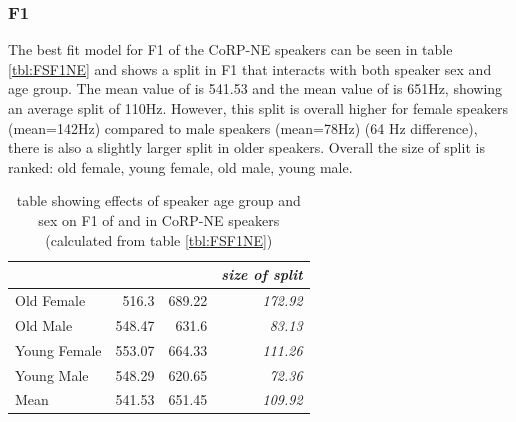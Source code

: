 \documentclass[../../../00.FullDoc/tex/ThesisSkeleton-draft2]{subfiles}
\begin{document}
\subsubsection{F1} \label{subsubsec:NEF1}

The best fit model for F1 of the CoRP-NE speakers can be seen in table \ref{tbl:FSF1NE} and shows a \FS{} split in F1 that interacts with both speaker sex and age group. The mean value of \foot{} is 541.53 and the mean value of \strutt{} is 651Hz, showing an average split of 110Hz. However, this split is overall higher for female speakers (mean=142Hz) compared to male speakers (mean=78Hz) (64 Hz difference), there is also a slightly larger split in older speakers. Overall the size of split is ranked: old female, young female, old male, young male.



\begin{table}[htbp]
	\centering
	\begin{tabular}{lrrr}
		\hline
		& \multicolumn{1}{l}{\foot{}} & \multicolumn{1}{l}{\strutt{}} & \multicolumn{1}{l}{\textit{size of split}} \\
		\hline
		Old Female & 516.3 & 689.22 & \textit{172.92} \\
		Old Male & 548.47 & 631.6 & \textit{83.13} \\
		Young Female & 553.07 & 664.33 & \textit{111.26} \\
		Young Male & 548.29 & 620.65 & \textit{72.36} \\
		Mean  & 541.53 & 651.45 & \textit{109.92} \\
		\hline
	\end{tabular}%
	\caption{table showing effects of speaker age group and sex on F1 of \foot{} and \strutt{} in CoRP-NE speakers (calculated from table \ref{tbl:FSF1NE})}
	\label{tbl:FSF1NEinter}%
\end{table}%

\begin{figure}[h]
	
	\caption{} \label{fig:FSF1NE}
\end{figure}
\end{document}
